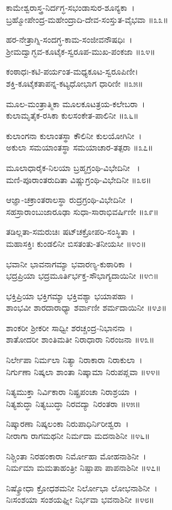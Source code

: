 ಕಾಮೇಶ್ವರಾಸ್ತ್ರ-ನಿರ್ದಗ್ಧ-ಸಭಂಡಾಸುರ-ಶೂನ್ಯಕಾ~।\\
ಬ್ರಹ್ಮೋಪೇಂದ್ರ-ಮಹೇಂದ್ರಾದಿ-ದೇವ-ಸಂಸ್ತುತ-ವೈಭವಾ ॥೩೩॥

ಹರ-ನೇತ್ರಾಗ್ನಿ-ಸಂದಗ್ಧ-ಕಾಮ-ಸಂಜೀವನೌಷಧಿಃ~।\\
ಶ್ರೀಮದ್ವಾಗ್ಭವ-ಕೂಟೈಕ-ಸ್ವರೂಪ-ಮುಖ-ಪಂಕಜಾ ॥೩೪॥

ಕಂಠಾಧಃ-ಕಟಿ-ಪರ್ಯಂತ-ಮಧ್ಯಕೂಟ-ಸ್ವರೂಪಿಣೀ।\\
ಶಕ್ತಿ-ಕೂಟೈಕತಾಪನ್ನ-ಕಟ್ಯಧೋಭಾಗ ಧಾರಿಣೀ ॥೩೫॥

ಮೂಲ-ಮಂತ್ರಾತ್ಮಿಕಾ ಮೂಲಕೂಟತ್ರಯ-ಕಲೇಬರಾ~।\\
ಕುಲಾಮೃತೈಕ-ರಸಿಕಾ ಕುಲಸಂಕೇತ-ಪಾಲಿನೀ ॥೩೬॥

ಕುಲಾಂಗನಾ ಕುಲಾಂತಸ್ಥಾ ಕೌಲಿನೀ ಕುಲಯೋಗಿನೀ~।\\
ಅಕುಲಾ ಸಮಯಾಂತಸ್ಥಾ ಸಮಯಾಚಾರ-ತತ್ಪರಾ ॥೩೭॥

ಮೂಲಾಧಾರೈಕ-ನಿಲಯಾ ಬ್ರಹ್ಮಗ್ರಂಥಿ-ವಿಭೇದಿನೀ ~।\\
ಮಣಿ-ಪೂರಾಂತರುದಿತಾ ವಿಷ್ಣುಗ್ರಂಥಿ-ವಿಭೇದಿನೀ ॥೩೮॥

ಆಜ್ಞಾ-ಚಕ್ರಾಂತರಾಲಸ್ಥಾ ರುದ್ರಗ್ರಂಥಿ-ವಿಭೇದಿನೀ~।\\
ಸಹಸ್ರಾರಾಂಬುಜಾರೂಢಾ ಸುಧಾ-ಸಾರಾಭಿವರ್ಷಿಣೀ ॥೩೯॥

ತಡಿಲ್ಲತಾ-ಸಮರುಚಿಃ ಷಟ್‍ಚಕ್ರೋಪರಿ-ಸಂಸ್ಥಿತಾ~।\\
ಮಹಾಸಕ್ತಿಃ ಕುಂಡಲಿನೀ ಬಿಸತಂತು-ತನೀಯಸೀ ॥೪೦॥

ಭವಾನೀ ಭಾವನಾಗಮ್ಯಾ ಭವಾರಣ್ಯ-ಕುಠಾರಿಕಾ~।\\
ಭದ್ರಪ್ರಿಯಾ ಭದ್ರಮೂರ್ತಿರ್ಭಕ್ತ-ಸೌಭಾಗ್ಯದಾಯಿನೀ ॥೪೧॥

ಭಕ್ತಿಪ್ರಿಯಾ ಭಕ್ತಿಗಮ್ಯಾ ಭಕ್ತಿವಶ್ಯಾ ಭಯಾಪಹಾ~।\\
ಶಾಂಭವೀ ಶಾರದಾರಾಧ್ಯಾ ಶರ್ವಾಣೀ ಶರ್ಮದಾಯಿನೀ ॥೪೨॥

ಶಾಂಕರೀ ಶ್ರೀಕರೀ ಸಾಧ್ವೀ ಶರಚ್ಚಂದ್ರ-ನಿಭಾನನಾ~।\\
ಶಾತೋದರೀ ಶಾಂತಿಮತೀ ನಿರಾಧಾರಾ ನಿರಂಜನಾ ॥೪೩॥

ನಿರ್ಲೇಪಾ ನಿರ್ಮಲಾ ನಿತ್ಯಾ ನಿರಾಕಾರಾ ನಿರಾಕುಲಾ~।\\
ನಿರ್ಗುಣಾ ನಿಷ್ಕಲಾ ಶಾಂತಾ ನಿಷ್ಕಾಮಾ ನಿರುಪಪ್ಲವಾ ॥೪೪॥

ನಿತ್ಯಮುಕ್ತಾ ನಿರ್ವಿಕಾರಾ ನಿಷ್ಪ್ರಪಂಚಾ ನಿರಾಶ್ರಯಾ~।\\
ನಿತ್ಯಶುದ್ಧಾ ನಿತ್ಯಬುದ್ಧಾ ನಿರವದ್ಯಾ ನಿರಂತರಾ ॥೪೫॥

ನಿಷ್ಕಾರಣಾ ನಿಷ್ಕಲಂಕಾ ನಿರುಪಾಧಿರ್ನಿರೀಶ್ವರಾ~।\\
ನೀರಾಗಾ ರಾಗಮಥನೀ ನಿರ್ಮದಾ ಮದನಾಶಿನೀ ॥೪೬॥

ನಿಶ್ಚಿಂತಾ ನಿರಹಂಕಾರಾ ನಿರ್ಮೋಹಾ ಮೋಹನಾಶಿನೀ~।\\
ನಿರ್ಮಮಾ ಮಮತಾಹಂತ್ರೀ ನಿಷ್ಪಾಪಾ ಪಾಪನಾಶಿನೀ ॥೪೭॥

ನಿಷ್ಕ್ರೋಧಾ ಕ್ರೋಧಶಮನೀ ನಿರ್ಲೋಭಾ ಲೋಭನಾಶಿನೀ~।\\
ನಿಃಸಂಶಯಾ ಸಂಶಯಘ್ನೀ ನಿರ್ಭವಾ ಭವನಾಶಿನೀ ॥೪೮॥

